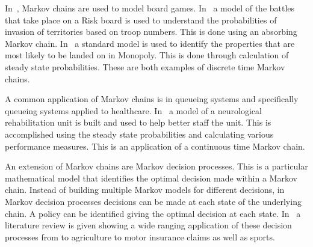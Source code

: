 In~\cite{tan1997markov, stewart1996monopoly}, Markov chains are used to model
board games. In~\cite{tan1997markov} a model of the battles that take place on
a Risk board is used
to understand the probabilities of invasion of territories based on troop
numbers. This is done using an absorbing Markov chain. In~\cite{stewart1996monopoly} a
standard model is used to identify the properties that are most likely to be
landed on in Monopoly. This is done through calculation of steady state
probabilities. These are both examples of discrete time Markov chains.

A common application of Markov chains is in queueing systems and specifically
queueing systems applied to healthcare. In~\cite{griffiths2013modelling} a
model of a neurological rehabilitation unit is built and used to help better
staff the unit.  This is accomplished using the steady state probabilities and
calculating various performance measures.  This is an application of a
continuous time Markov chain.

An extension of Markov chains are Markov decision processes. This is a
particular mathematical model that identifies the optimal decision made within a
Markov chain.
Instead of building multiple Markov models for different decisions, in Markov
decision processes decisions can be made at each state of the underlying chain.
A policy can be identified giving the optimal decision at each state.
In~\cite{white1993survey} a literature review is given showing a wide
ranging application of these decision processes from to agriculture to motor
insurance claims as well as sports.
